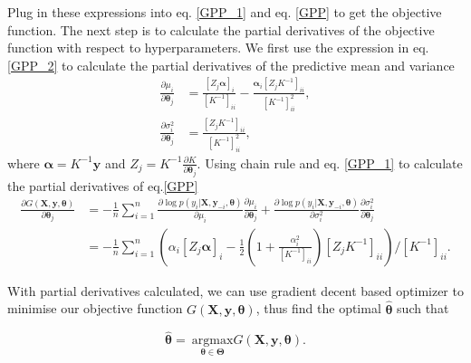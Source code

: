 \documentclass[11pt,a4paper]{article}
\theoremstyle{definition}
\numberwithin{equation}{section}
\let\vec\mathbf
\begin{document}
	Plug in these expressions into eq. \ref{GPP_1} and eq. \ref{GPP} to get the objective function. The next step is to calculate the partial derivatives of the objective function with respect to hyperparameters. We first use the expression in eq. \ref{GPP_2} to calculate the partial derivatives of the predictive mean and variance
	\begin{equation}\label{GPP_3}
	\begin{split}
	\frac{\partial\mu_i}{\partial \vec \theta_j} &= \frac{[Z_j \vec \alpha]_i}{[K^{-1}]_{ii}} - \frac{\vec \alpha_i[Z_j K^{-1}]_{ii}}{[K^{-1}]^2_{ii}},\\
	\frac{\partial\sigma^2_i}{\partial \vec \theta_j} &= \frac{[Z_j K^{-1}]_{ii}}{[K^{-1}]^2_{ii}},
	\end{split}
	\end{equation}
	where $\vec \alpha = K^{-1}\vec y$ and $Z_j = K^{-1}\frac{\partial K}{\partial \vec \theta_j}$. Using chain rule and eq. \ref{GPP_1} to calculate the partial derivatives of eq.\ref{GPP}
	\begin{equation}\label{GPP_derivative}
	\begin{split}
	\frac{\partial G(\vec X,\vec y, \vec \theta)}{\partial \vec \theta_j} &= -\frac{1}{n}\sum_{i=1}^{n}\frac{\partial \log p(y_i|\vec X,\vec y_{-i},\vec \theta)}{\partial \mu_i}\frac{\partial \mu_i}{\partial \vec \theta_j} + \frac{\partial \log p(y_i|\vec X,\vec y_{-i},\vec \theta)}{\partial \sigma^2_i}\frac{\partial \sigma^2_i}{\partial \vec \theta_j}\\
	&=-\frac{1}{n}\sum_{i=1}^{n}\left(\alpha_i[Z_j \vec{\alpha}]_i - \frac{1}{2}\left(1+\frac{\alpha^2_i}{[K^{-1}]_{ii}}\right)[Z_j K^{-1}]_{ii}\right)/[K^{-1}]_{ii}.
	\end{split}
	\end{equation}
	
	With partial derivatives calculated, we can use gradient decent based optimizer to minimise our objective function $G(\vec X,\vec y, \vec \theta)$, thus find the optimal $\hat{\vec\theta}$ such that
	
	\begin{equation}
	\vec{\hat \theta} = \ \underset{\vec \theta \in \vec \Theta}{\mathrm{argmax}}G(\vec X,\vec y, \vec \theta).
	\end{equation}
	
\end{document}
